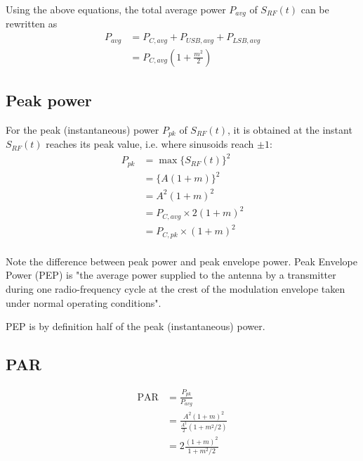 \documentclass[12pt]{article}
\DeclareMathOperator{\PAR}{PAR}
\begin{document}
Using the above equations, the total average power $P_{avg}$ of $S_{RF}(t)$ can be rewritten as
\begin{equation}
\begin{aligned}
P_{avg} & = P_{C,avg} + P_{USB,avg} + P_{LSB,avg} \\
        & = P_{C,avg} (1 + \frac{m^2}{2})
\end{aligned}
\end{equation}

\subsection{Peak power}

For the peak (instantaneous) power $P_{pk}$ of $S_{RF}(t)$, it is obtained at the instant $S_{RF}(t)$ reaches its peak value, i.e. where sinusoids reach $\pm 1$:
\begin{equation}
\begin{aligned}
P_{pk} & = \max \{ S_{RF}(t) \}^2 \\
        & =  \{ A ( 1 + m ) \}^2 \\
        & =  A^2 ( 1 + m )^2 \\
        & =  P_{C,avg} \times 2 ( 1 + m )^2 \\
        & =  P_{C,pk} \times ( 1 + m )^2 \\
\end{aligned}
\end{equation}

Note the difference between peak power and peak envelope power. Peak Envelope Power (PEP) is "the average power supplied to the antenna by a transmitter during one radio-frequency cycle at the crest of the modulation envelope taken under normal operating conditions".

PEP is by definition half of the peak (instantaneous) power. 

\subsection{PAR}

\begin{equation}
\begin{aligned}
\PAR     & =  \frac{P_{pk}}{P_{avg}} \\
        & =  \frac{A^2 ( 1 + m )^2 }{\frac{A^2}{2}  ( 1 + m^2 / 2)} \\
        & =  2 \frac{( 1 + m )^2 }{ 1 + m^2 / 2} \\
\end{aligned}
\end{equation}
\end{document}

